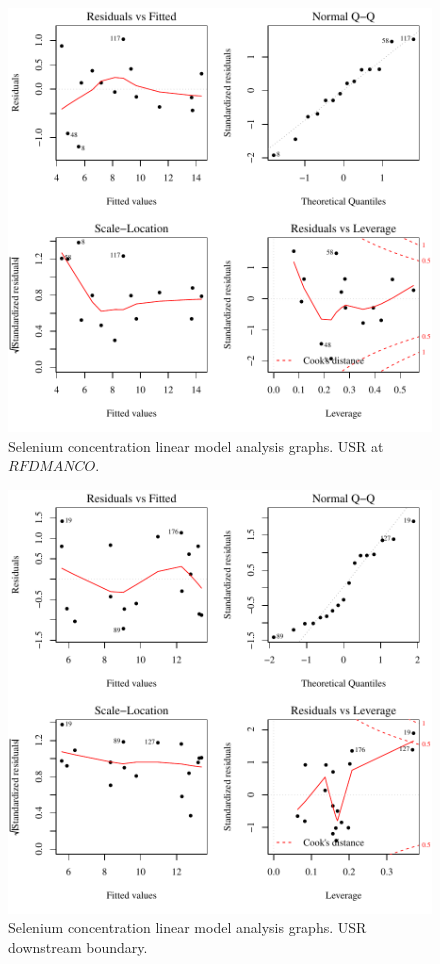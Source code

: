 \begin{figure}[htbp]
	\begin{center}
	\includegraphics[width=6in]{"Figures/Results_USR/Conc Model lm-fit U167"}
	\caption{Selenium concentration linear model analysis graphs.  USR at $RFDMANCO$.}
	\end{center}
\end{figure}
\newpage

\begin{figure}[htbp]
	\begin{center}
	\includegraphics[width=6in]{"Figures/Results_USR/Conc Model lm-fit U201"}
	\caption{Selenium concentration linear model analysis graphs.  USR downstream boundary.}
	\end{center}
\end{figure}
\newpage

